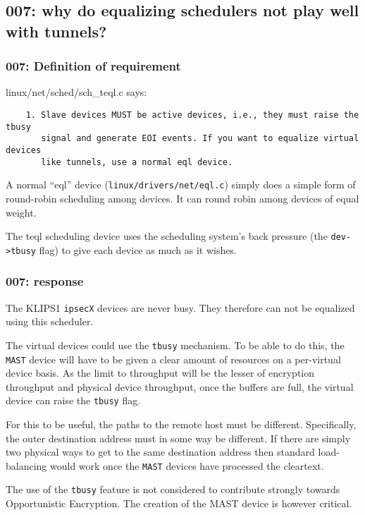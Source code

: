 \subsection{007: why do equalizing schedulers not play well with tunnels?}

\subsubsection{007: Definition of requirement }

linux/net/sched/sch\_teql.c says:

\begin{verbatim}
    1. Slave devices MUST be active devices, i.e., they must raise the tbusy
       signal and generate EOI events. If you want to equalize virtual devices
       like tunnels, use a normal eql device.
\end{verbatim}

A normal ``eql'' device ({\tt linux/drivers/net/eql.c}) simply does a simple
form of round-robin scheduling among devices. It can round robin among
devices of equal weight.

The teql scheduling device uses the scheduling system's back pressure (the
{\tt dev->tbusy} flag) to give each device as much as it wishes.

\subsubsection{007: response}

The KLIPS1 {\tt ipsecX} devices are never busy. They therefore can not be
equalized using this scheduler.

The virtual devices could use the {\tt tbusy} mechanism. To be able to
do this, the {\tt MAST} device will have to be given a clear amount of
resources on a per-virtual device basis. As the limit to throughput will be
the lesser of encryption throughput and physical device throughput, once the
buffers are full, the virtual device can raise the {\tt tbusy} flag.

For this to be useful, the paths to the remote host must be
different. Specifically, the outer destination address must in some way be
different. If there are simply two physical ways to get to the same
destination address then standard load-balancing would work once the 
{\tt MAST} devices have processed the cleartext.

The use of the {\tt tbusy} feature is not considered to contribute strongly
towards Opportunistic Encryption. The creation of the MAST device is however
critical.
 



